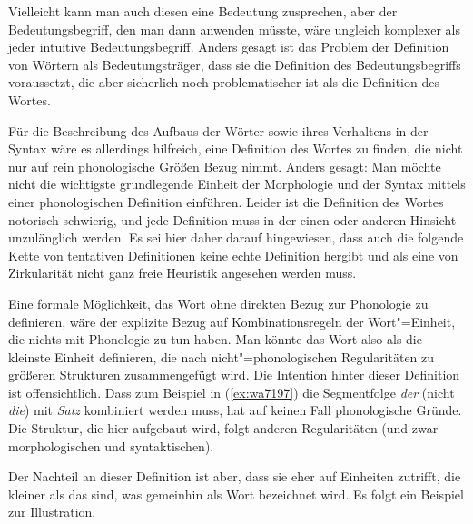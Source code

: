 \begin{exe}
\end{exe}

Vielleicht kann man auch diesen eine Bedeutung zusprechen, aber der Bedeutungsbegriff, den man dann anwenden müsste, wäre ungleich komplexer als jeder intuitive Bedeutungsbegriff.
Anders gesagt ist das Problem der Definition von Wörtern als Bedeutungsträger, dass sie die Definition des Bedeutungsbegriffs voraussetzt, die aber sicherlich noch problematischer ist als die Definition des Wortes.

Für die Beschreibung des Aufbaus der Wörter sowie ihres Verhaltens in der Syntax wäre es allerdings hilfreich, eine Definition des Wortes zu finden, die nicht nur auf rein phonologische Größen Bezug nimmt.
Anders gesagt:
Man möchte nicht die wichtigste grundlegende Einheit der Morphologie und der Syntax mittels einer phonologischen Definition einführen.
Leider ist die Definition des Wortes notorisch schwierig, und jede Definition muss in der einen oder anderen Hinsicht unzulänglich werden.
Es sei hier daher darauf hingewiesen, dass auch die folgende Kette von tentativen Definitionen keine echte Definition hergibt und als eine von Zirkularität nicht ganz freie Heuristik angesehen werden muss.

Eine formale Möglichkeit, das Wort ohne direkten Bezug zur Phonologie zu definieren, wäre der explizite Bezug auf Kombinationsregeln der Wort"=Einheit, die nichts mit Phonologie zu tun haben.
Man könnte das Wort also als die kleinste Einheit definieren, die nach nicht"=phonologischen Regularitäten zu größeren Strukturen zusammengefügt wird.
Die Intention hinter dieser Definition ist offensichtlich.
Dass zum Beispiel in (\ref{ex:wa7197}) die Segmentfolge \textit{der} (nicht \textit{die}) mit \textit{Satz} kombiniert werden muss, hat auf keinen Fall phonologische Gründe.
Die Struktur, die hier aufgebaut wird, folgt anderen Regularitäten (und zwar morphologischen und syntaktischen).

\begin{exe}
  \ex\label{ex:wa7197}
  \begin{xlist}
  \end{xlist}
\end{exe}

Der Nachteil an dieser Definition ist aber, dass sie eher auf Einheiten zutrifft, die kleiner als das sind, was gemeinhin als Wort bezeichnet wird.
Es folgt ein Beispiel zur Illustration.

